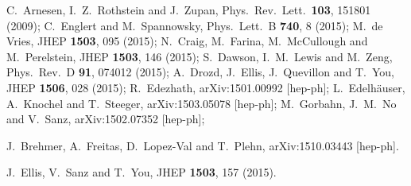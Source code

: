   C.~Arnesen, I.~Z.~Rothstein and J.~Zupan,
  Phys.\ Rev.\ Lett.\  {\bf 103}, 151801 (2009);
  C.~Englert and M.~Spannowsky,
  Phys.\ Lett.\ B {\bf 740}, 8 (2015);
  M.~de Vries,
  JHEP {\bf 1503}, 095 (2015);
  N.~Craig, M.~Farina, M.~McCullough and M.~Perelstein,
  JHEP {\bf 1503}, 146 (2015);
  S.~Dawson, I.~M.~Lewis and M.~Zeng,
  Phys.\ Rev.\ D {\bf 91}, 074012 (2015);
  A.~Drozd, J.~Ellis, J.~Quevillon and T.~You,
  JHEP {\bf 1506}, 028 (2015);
  R.~Edezhath,
  arXiv:1501.00992 [hep-ph];
  L.~Edelh\"auser, A.~Knochel and T.~Steeger,
  arXiv:1503.05078 [hep-ph];
  M.~Gorbahn, J.~M.~No and V.~Sanz,
  arXiv:1502.07352 [hep-ph];

  J.~Brehmer, A.~Freitas, D.~Lopez-Val and T.~Plehn,
  arXiv:1510.03443 [hep-ph].

  J.~Ellis, V.~Sanz and T.~You,
  JHEP {\bf 1503}, 157 (2015).

